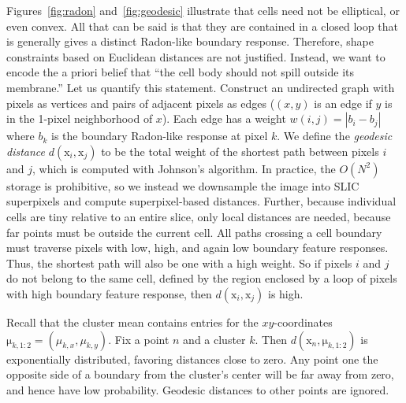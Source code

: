 \documentclass[english]{article}
\newcommand{\+}[1]{\ensuremath{\boldsymbol{\mathrm{#1}}}}
\begin{document}
Figures~\ref{fig:radon} and~\ref{fig:geodesic} illustrate that cells need not be elliptical, or even convex. All that can be said is that they are contained in a closed loop that is generally gives a distinct Radon-like boundary response. Therefore, shape constraints based on Euclidean distances are not justified. Instead, we want to encode the a priori belief that ``the cell body should not spill outside its membrane.'' Let us quantify this statement. Construct an undirected graph with pixels as vertices and pairs of adjacent pixels as edges ($(x,y)$ is an edge if $y$ is in the 1-pixel neighborhood of $x$). Each edge has a weight $w(i,j) = \left| b_i - b_j \right|$ where $b_k$ is the boundary Radon-like response at pixel $k$. We define the \emph{geodesic distance} $d(\+{x}_i, \+{x}_j)$ to be the total weight of the shortest path between pixels $i$ and $j$, which is computed with Johnson's algorithm. In practice, the $O(N^2)$ storage is prohibitive, so we instead we downsample the image into SLIC superpixels \cite{Achanta2012} and compute superpixel-based distances. Further, because individual cells are tiny relative to an entire slice, only local distances are needed, because far points must be outside the current cell. All paths crossing a cell boundary must traverse pixels with low, high, and again low boundary feature responses. Thus, the shortest path will also be one with a high weight. So if pixels $i$ and $j$ do not belong to the same cell, defined by the region enclosed by a loop of pixels with high boundary feature response, then $d(\+{x}_i, \+{x}_j)$ is high.

Recall that the cluster mean contains entries for the $xy$-coordinates $\+{\mu}_{k,1:2} = (\mu_{k,x}, \mu_{k,y})$. Fix a point $n$ and a cluster $k$. Then $d(\+{x}_n, \+{\mu}_{k,1:2})$ is exponentially distributed, favoring distances close to zero. Any point one the opposite side of a boundary from the cluster's center will be far away from zero, and hence have low probability. Geodesic distances to other points are ignored.
\end{document}
